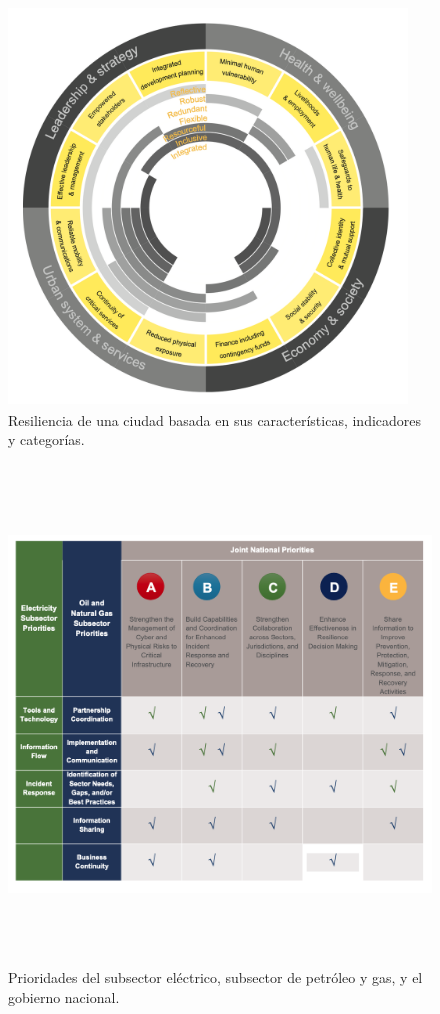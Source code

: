 \documentclass{article}
\begin{document}
\begin{figure}
\centering
\includegraphics[width=4.16667in,height=4.16667in]{Imagen 1.png}
\caption{Resiliencia de una ciudad basada en sus características,
indicadores y categorías.}
\end{figure}

\begin{figure}
\centering
\includegraphics[width=5.20833in,height=5.20833in]{Imagen 2.png}
\caption{Prioridades del subsector eléctrico, subsector de petróleo y
gas, y el gobierno nacional.}
\end{figure}
\end{document}
